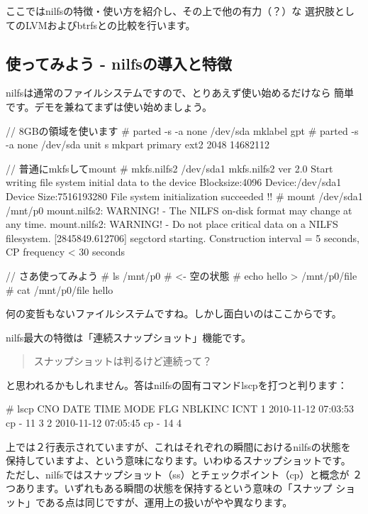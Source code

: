 \documentclass[mingoth,a4paper]{jsarticle}
\begin{document}
ここではnilfsの特徴・使い方を紹介し、その上で他の有力（？）な
選択肢としてのLVMおよびbtrfsとの比較を行います。

\subsection{使ってみよう - nilfsの導入と特徴}
\label{sec:try-nilfs}
nilfsは通常のファイルシステムですので、とりあえず使い始めるだけなら
簡単です。デモを兼ねてまずは使い始めましょう。

\begin{commandline}
// 8GBの領域を使います
# parted -s -a none /dev/sda mklabel gpt
# parted -s -a none /dev/sda unit s mkpart primary ext2 2048 14682112

// 普通にmkfsしてmount
# mkfs.nilfs2 /dev/sda1
mkfs.nilfs2 ver 2.0
Start writing file system initial data to the device
       Blocksize:4096  Device:/dev/sda1  Device Size:7516193280
File system initialization succeeded !!
# mount /dev/sda1 /mnt/p0
mount.nilfs2: WARNING! - The NILFS on-disk format may change at any time.
mount.nilfs2: WARNING! - Do not place critical data on a NILFS filesystem.
[2845849.612706] segctord starting. Construction interval = 5 seconds, CP frequency < 30 seconds

// さあ使ってみよう
# ls /mnt/p0
# <- 空の状態
# echo hello > /mnt/p0/file
# cat /mnt/p0/file
hello
\end{commandline}

何の変哲もないファイルシステムですね。しかし面白いのはここからです。

nilfs最大の特徴は「連続スナップショット」機能です。
\begin{quote}
\Large{スナップショットは判るけど連続って？}
\end{quote}
と思われるかもしれません。答はnilfsの固有コマンドlscpを打つと判ります：

\begin{commandline}
# lscp
CNO        DATE     TIME  MODE  FLG   NBLKINC       ICNT
  1  2010-11-12 07:03:53   cp    -         11          3
  2  2010-11-12 07:05:45   cp    -         14          4
\end{commandline}

上では２行表示されていますが、これはそれぞれの瞬間におけるnilfsの状態を
保持していますよ、という意味になります。いわゆるスナップショットです。
ただし、nilfsではスナップショット（ss）とチェックポイント（cp）と概念が
２つあります。いずれもある瞬間の状態を保持するという意味の「スナップ
ショット」である点は同じですが、運用上の扱いがやや異なります。
\end{document}
